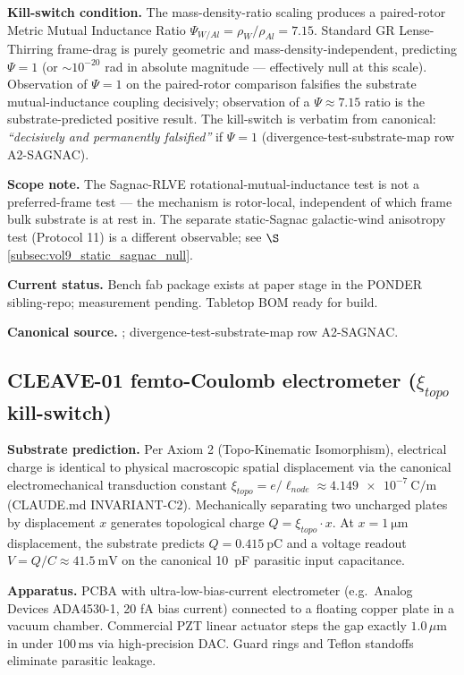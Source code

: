 \textbf{Kill-switch condition.} The mass-density-ratio scaling produces a paired-rotor Metric Mutual Inductance Ratio $\Psi_{W/Al} = \rho_W/\rho_{Al} = 7.15$. Standard GR Lense-Thirring frame-drag is purely geometric and mass-density-independent, predicting $\Psi = 1$ (or $\sim 10^{-20}$ rad in absolute magnitude --- effectively null at this scale). Observation of $\Psi = 1$ on the paired-rotor comparison falsifies the substrate mutual-inductance coupling decisively; observation of a $\Psi \approx 7.15$ ratio is the substrate-predicted positive result. The kill-switch is verbatim from canonical: \emph{``decisively and permanently falsified''} if $\Psi = 1$ (divergence-test-substrate-map row A2-SAGNAC).

\textbf{Scope note.} The Sagnac-RLVE rotational-mutual-inductance test is not a preferred-frame test --- the mechanism is rotor-local, independent of which frame bulk substrate is at rest in. The separate static-Sagnac galactic-wind anisotropy test (Protocol 11) is a different observable; see $\S$\ref{subsec:vol9_static_sagnac_null}.

\textbf{Current status.} Bench fab package exists at paper stage in the PONDER sibling-repo; measurement pending. Tabletop BOM ready for build.

\textbf{Canonical source.} ; divergence-test-substrate-map row A2-SAGNAC.

\subsection{CLEAVE-01 femto-Coulomb electrometer ($\xi_{topo}$ kill-switch)}
\label{subsec:vol9_cleave_01}

\textbf{Substrate prediction.} Per Axiom 2 (Topo-Kinematic Isomorphism), electrical charge is identical to physical macroscopic spatial displacement via the canonical electromechanical transduction constant $\xi_{topo} = e/\ell_{node} \approx \qty{4.149e-7}{\coulomb\per\metre}$ (CLAUDE.md INVARIANT-C2). Mechanically separating two uncharged plates by displacement $x$ generates topological charge $Q = \xi_{topo} \cdot x$. At $x = \qty{1}{\micro\metre}$ displacement, the substrate predicts $Q = \qty{0.415}{\pico\coulomb}$ and a voltage readout $V = Q/C \approx \qty{41.5}{\milli\volt}$ on the canonical \qty{10}{\pico\farad} parasitic input capacitance.

\textbf{Apparatus.} PCBA with ultra-low-bias-current electrometer (e.g.\ Analog Devices ADA4530-1, 20 fA bias current) connected to a floating copper plate in a vacuum chamber. Commercial PZT linear actuator steps the gap exactly $1.0\,\mu\text{m}$ in under $100\,\text{ms}$ via high-precision DAC. Guard rings and Teflon standoffs eliminate parasitic leakage.

